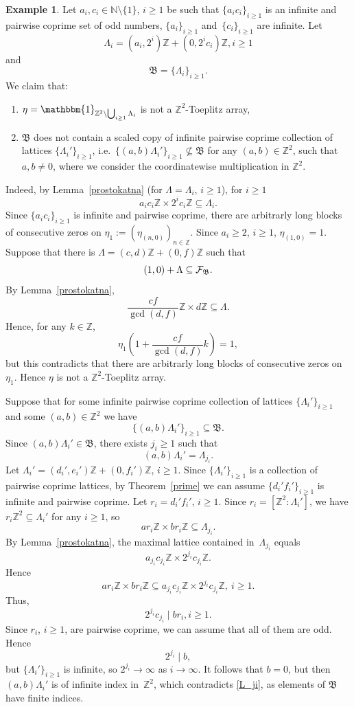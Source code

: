 \documentclass[leqno,a4paper,12pt]{article}
\theoremstyle{definition}
\newtheorem{Example}[Th]{Example}
\newcommand{\cf}{{\cal F}}
\newcommand{\Z}{{\mathbb{Z}}}
\newcommand{\N}{{\mathbb{N}}}
\newcommand{\raz}{\mathbbm{1}}
\begin{document}
\begin{Example}\label{ex_lattices}
Let $a_i,c_i\in\N\setminus\{1\}$, $i\geq1$ be such that $\{a_ic_i\}_{i\geq1}$ is an infinite and pairwise coprime set of odd numbers, $\{a_i\}_{i\geq1}$ and~$\{c_i\}_{i\geq1}$ are infinite.
Let \[\Lambda_i=(a_i,2^i)\Z+(0,2^ic_i)\Z, i\geq1\] and \[\mathfrak{B}=\{\Lambda_i\}_{i\geq1}.\] We claim that:
\begin{enumerate}[1)]
    \item $\eta=\raz_{\Z^2\setminus\bigcup_{i\geq1}\Lambda_i}$ is not a $\Z^2$-Toeplitz array,
    \item $\mathfrak{B}$ does not contain a scaled copy of infinite pairwise coprime collection of lattices $\{\Lambda_i'\}_{i\geq1}$,
    i.e.\ $\{(a,b)\Lambda_i'\}_{i\geq1}\nsubseteq\mathfrak{B}$ for any $(a,b)\in\Z^2$, such that $a,b\neq0$, where we consider the coordinatewise multiplication in $\Z^2$.
\end{enumerate}

Indeed, by Lemma~\ref{prostokatna} (for $\Lambda=\Lambda_i$, $i\geq1$), for $i\geq1$ \[a_ic_i\Z\times 2^ic_i\Z\subseteq\Lambda_i.\] Since $\{a_ic_i\}_{i\geq1}$ is infinite and pairwise coprime, there are arbitrarly long blocks of consecutive zeros on $\eta_1:=\left(\eta_{(n,0)}\right)_{n\in\Z}$. Since $a_i\geq2$, $i\geq1$, $\eta_{(1,0)}=1$. Suppose that there is $\Lambda=(c,d)\Z+(0,f)\Z$ such that \[(1,0)+\Lambda\subseteq\cf_\mathfrak{B}.\] By Lemma~\ref{prostokatna},
\[
\frac{cf}{\gcd(d,f)}\Z\times d\Z\subseteq \Lambda.
\]
Hence, for any $k\in\Z$,
\[
\eta_1\left(1+\frac{cf}{\gcd(d,f)}k\right)=1,
\]
but this contradicts that there are arbitrarly long blocks of consecutive zeros on $\eta_1$. Hence $\eta$ is not a $\Z^2$-Toeplitz array.

Suppose that for some infinite pairwise coprime collection of lattices $\{\Lambda_i'\}_{i\geq1}$ and some $(a,b)\in\Z^2$ we have
\[\{(a,b)\Lambda_i'\}_{i\geq1}\subseteq\mathfrak{B}.\] Since $(a,b)\Lambda_i'\in\mathfrak{B}$, there exists $j_i\geq1$ such that \begin{equation}\label{L_ji}
(a,b)\Lambda_i'=\Lambda_{j_i}.
\end{equation} Let $\Lambda_i'=(d_i',e_i')\Z+(0,f_i')\Z$, $i\geq1$. Since $\{\Lambda_i'\}_{i\geq1}$  is a collection of pairwise coprime lattices, by Theorem~\ref{prime} we can assume $\{d_i'f_i'\}_{i\geq1}$ is infinite and pairwise coprime. Let $r_i=d_i'f_i'$, $i\geq1$. Since $r_i=[\Z^2:\Lambda_i']$, we have $r_i\Z^2\subseteq\Lambda_i'$ for any $i\geq1$, so \[ar_i\Z\times br_i\Z\subseteq\Lambda_{j_i}.\] By Lemma~\ref{prostokatna}, the maximal lattice contained in~$\Lambda_{j_i}$ equals \[a_{j_i}c_{j_i}\Z\times 2^{j_i}c_{j_i}\Z.\] Hence
\[
ar_i\Z\times br_i\Z\subseteq a_{j_i}c_{j_i}\Z\times 2^{j_i}c_{j_i}\Z,\ i\geq1.
\]
Thus, \[2^{j_i}c_{j_i}\mid br_i, i\geq1.\] Since $r_i$, $i\geq1$, are pairwise coprime, we can assume that all of them are odd. Hence \[2^{j_i}\mid b,\] but $\{\Lambda_i'\}_{i\geq1}$ is infinite, so $2^{j_i}\to\infty$ as $i\to\infty$. It follows that $b=0$, but then $(a,b)\Lambda_i'$ is of infinite index in~$\Z^2$, which contradicts \eqref{L_ji}, as elements of $\mathfrak{B}$ have finite indices.
\end{Example}
\end{document}

